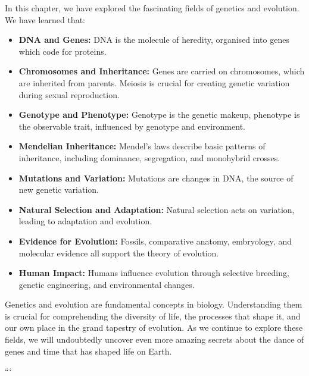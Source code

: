 In this chapter, we have explored the fascinating fields of genetics and evolution. We have learned that:

\begin{itemize}
    \item \textbf{DNA and Genes:} DNA is the molecule of heredity, organised into genes which code for proteins.
    \item \textbf{Chromosomes and Inheritance:} Genes are carried on chromosomes, which are inherited from parents. Meiosis is crucial for creating genetic variation during sexual reproduction.
    \item \textbf{Genotype and Phenotype:} Genotype is the genetic makeup, phenotype is the observable trait, influenced by genotype and environment.
    \item \textbf{Mendelian Inheritance:} Mendel's laws describe basic patterns of inheritance, including dominance, segregation, and monohybrid crosses.
    \item \textbf{Mutations and Variation:} Mutations are changes in DNA, the source of new genetic variation.
    \item \textbf{Natural Selection and Adaptation:} Natural selection acts on variation, leading to adaptation and evolution.
    \item \textbf{Evidence for Evolution:}  Fossils, comparative anatomy, embryology, and molecular evidence all support the theory of evolution.
    \item \textbf{Human Impact:} Humans influence evolution through selective breeding, genetic engineering, and environmental changes.
\end{itemize}

Genetics and evolution are fundamental concepts in biology.  Understanding them is crucial for comprehending the diversity of life, the processes that shape it, and our own place in the grand tapestry of evolution.  As we continue to explore these fields, we will undoubtedly uncover even more amazing secrets about the dance of genes and time that has shaped life on Earth.


```